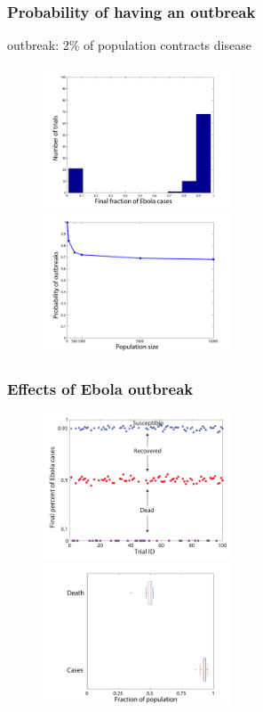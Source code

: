 \documentclass[30pt]{beamer}
\begin{document}
\begin{frame}
\frametitle{Probability of having an outbreak}
\vspace{5mm}
\textcolor{myblue}{outbreak}: 2\% of population contracts disease
\begin{figure}
\includegraphics[width = 0.5\textwidth]{N100Hist.pdf}
\includegraphics[width = 0.5\textwidth]{OutbreakProb.pdf}
\end{figure}
\end{frame}

\begin{frame}
\frametitle{Effects of Ebola outbreak}
\begin{figure}
\includegraphics[width = 0.5\textwidth]{N1000Scatter.pdf}
\includegraphics[width = 0.5\textwidth]{BWplot.pdf}

\end{figure}
\end{frame}
\end{document}
